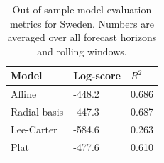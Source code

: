 \documentclass[11pt]{article}
\begin{document}
\begin{table}[h!]
    \centering
    \begin{tabular}{l l l} 
        \hline
        Model & Log-score & $R^2$ \\  
        \hline\hline
        Affine & -448.2 & 0.686 \\
        Radial basis & -447.3 & 0.687 \\
        Lee-Carter & -584.6 & 0.263\\ 
        Plat & -477.6 & 0.610 \\
        \hline
    \end{tabular}
    \caption{Out-of-sample model evaluation metrics for Sweden. Numbers are averaged over all forecast horizons and rolling windows.}
    \label{table:model_comparision_sweden}
\end{table}
\end{document}
